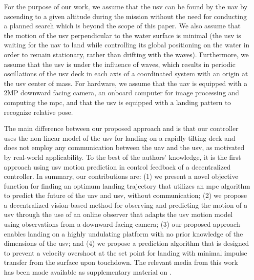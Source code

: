 \documentclass[letterpaper, 10 pt, journal, twoside]{IEEEtran}
\begin{document}
For the purpose of our work, we assume that the \ac{usv} can be found by the \ac{uav} by ascending to a given altitude during the mission without the need for conducting a planned search which is beyond the scope of this paper. We also assume that the motion of the \ac{usv} perpendicular to the water surface is minimal (the \ac{usv} is waiting for the \ac{uav} to land while controlling its global positioning on the water in order to remain stationary, rather than drifting with the waves). Furthermore, we assume that the \ac{usv} is under the influence of waves, which results in periodic oscillations of the \ac{usv} deck in each axis of a coordinated system with an origin at the \ac{usv} center of mass. For hardware, we assume that the \ac{uav} is equipped with a 2MP downward facing camera, an onboard computer for image processing and computing the \ac{mpc}, and that the \ac{usv} is equipped with a landing pattern to recognize relative pose.

The main difference between our proposed approach and \cite{Persson2019} is that our controller uses the non-linear model of the \ac{usv} for landing on a rapidly tilting deck and does not employ any communication between the \ac{uav} and the \ac{usv}, as motivated by real-world applicability. To the best of the authors' knowledge, it is the first approach using \ac{usv} motion prediction in control feedback of a decentralized controller. In summary, our contributions are: (1) we present a novel objective function for finding an optimum landing trajectory that utilizes an \ac{mpc} algorithm to predict the future of the \ac{uav} and \ac{usv}, without communication; (2) we propose a decentralized vision-based method for observing and predicting the motion of a \ac{usv} through the use of an online observer that adapts the \ac{usv} motion model using observations from a downward-facing camera; (3) our proposed approach enables landing on a highly undulating platform with no prior knowledge of the dimensions of the \ac{usv}; and (4) we propose a prediction algorithm that is designed to prevent a velocity overshoot at the set point for landing with minimal impulse transfer from the surface upon touchdown. 
The relevant media from this work has been made available as supplementary material on \href{\medialink}{\medialink}.
\end{document}
